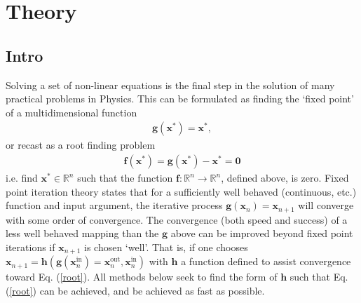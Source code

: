 
\chapter{Theory} %

\label{Chapter1} %


\section{Intro}

Solving a set of non-linear equations is the final step in the solution of many practical problems in Physics. This can be formulated as finding the `fixed point' of a multidimensional function
\begin{align}
\textbf{g}(\textbf{x}^*) = \textbf{x}^*,
\end{align}
or recast as a root finding problem
\begin{align}
\label{root}
\textbf{f}(\textbf{x}^*) = \textbf{g}(\textbf{x}^*) - \textbf{x}^* = \textbf{0} 
\end{align}
i.e. find $\textbf{x}^* \in \mathbb{R}^n$ such that the function $\textbf{f} : \mathbb{R}^n \rightarrow \mathbb{R}^n$, defined above, is zero. Fixed point iteration theory states that for a sufficiently well behaved (continuous, etc.) function and input argument, the iterative process $\textbf{g}(\textbf{x}_n) = \textbf{x}_{n+1}$ will converge with some order of convergence. The convergence (both speed and success) of a less well behaved mapping than the $\textbf{g}$ above can be improved beyond fixed point iterations if $\textbf{x}_{n+1}$ is chosen `well'. That is, if one chooses $\textbf{x}_{n+1} = \textbf{h}(\textbf{g}(\textbf{x}^{\text{in}}_n) = \textbf{x}^{\text{out}}_{n}, \textbf{x}_n^{\text{in}})$ with $\textbf{h}$ a function defined to assist convergence toward Eq$.$ (\ref{root}). All methods below seek to find the form of $\textbf{h}$ such that Eq$.$ (\ref{root}) can be achieved, and be achieved as fast as possible.

